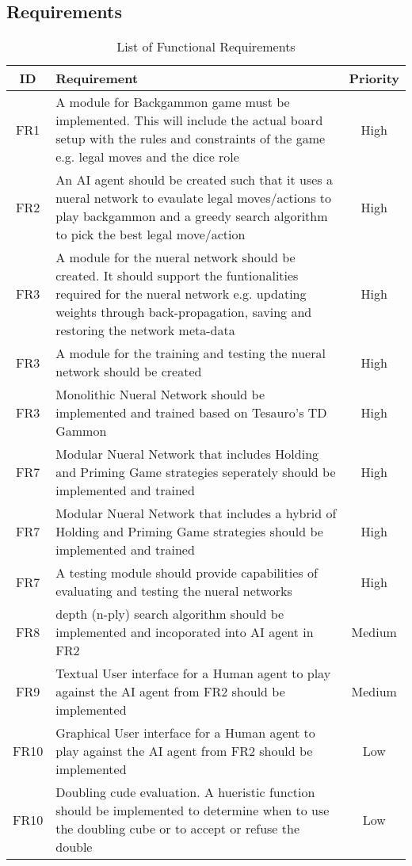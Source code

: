 \documentclass[12pt,a4paper]{article}
\begin{document}
\subsection{Requirements}
\begin{table}[htb]
    \centering
    \caption{List of Functional Requirements}
    \vspace*{6pt}
    \label{req}
    \begin{tabular}{cp{12cm}c}
        \hline
        \hline
        ID & Requirement & Priority \\ 
        \hline
        FR1 & A module for Backgammon game must be implemented. This will include the actual board setup with the rules and constraints of the game e.g. legal moves and the dice role & High \\
        \hline
        FR2 & An AI agent should be created such that it uses a nueral network to evaulate legal moves/actions to play backgammon and a greedy search algorithm to pick the best legal move/action & High \\
        \hline
        FR3 & A module for the nueral network should be created. It should support the funtionalities required for the nueral network e.g. updating weights through back-propagation, saving and restoring the network meta-data & High \\
        \hline
        FR3 & A module for the training and testing the nueral network should be created & High \\
        \hline
        FR3 & Monolithic Nueral Network should be implemented and trained based on Tesauro's TD Gammon & High \\
        \hline
        FR7 & Modular Nueral Network that includes Holding and Priming Game strategies seperately should be implemented and trained & High \\
        \hline
        FR7 & Modular Nueral Network that includes a hybrid of Holding and Priming Game strategies should be implemented and trained & High \\
        \hline
        FR7 & A testing module should provide capabilities of evaluating and testing the nueral networks & High \\
        \hline
        FR8 & depth (n-ply) search algorithm should be implemented and incoporated into AI agent in FR2 & Medium \\
        \hline
        FR9 & Textual User interface for a Human agent to play against the AI agent from FR2 should be implemented & Medium \\
        \hline
        FR10 & Graphical User interface for a Human agent to play against the AI agent from FR2 should be implemented & Low \\
        \hline
        FR10 & Doubling cude evaluation. A hueristic function should be implemented to determine when to use the doubling cube or to accept or refuse the double & Low \\
        \hline
        
    \end{tabular}
\end{table}
\end{document}
